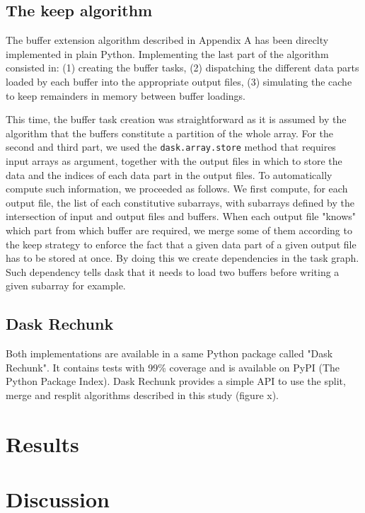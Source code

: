 \documentclass[conference]{IEEEtran}
\begin{document}
\subsection{The keep algorithm}

The buffer extension algorithm described in Appendix A has been direclty
implemented in plain Python. Implementing the last part of the algorithm
consisted in: (1) creating the buffer tasks, (2) dispatching the different data
parts loaded by each buffer into the appropriate output files, (3) simulating
the cache to keep remainders in memory between buffer loadings.

This time, the buffer task creation was straightforward as it is assumed by the
algorithm that the buffers constitute a partition of the whole array. For the
second and third part, we used the \texttt{dask.array.store} method that
requires input arrays as argument, together with the output files in which to
store the data and the indices of each data part in the output files. To
automatically compute such information, we proceeded as follows. We first
compute, for each output file, the list of each constitutive subarrays, with
subarrays defined by the intersection of input and output files and buffers.
When each output file "knows" which part from which buffer are required, we
merge some of them according to the keep strategy to enforce the fact that
a given data part of a given output file has to be stored at once. By doing this
we create dependencies in the task graph. Such dependency tells dask that it
needs to load two buffers before writing a given subarray for example.

\subsection{Dask Rechunk}

Both implementations are available in a same Python package called "Dask Rechunk". It
contains tests with 99\% coverage and is available on PyPI (The Python Package
Index). Dask Rechunk provides a simple API to use the split, merge and resplit
algorithms described in this study (figure x).

\section{Results}

\section{Discussion}
\end{document}
